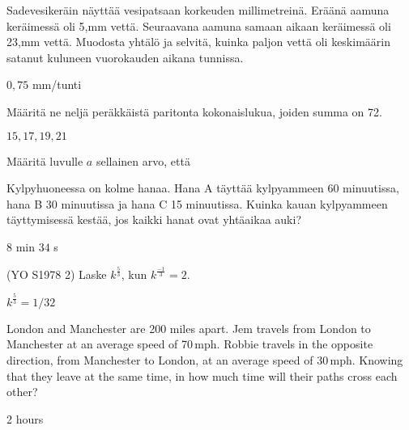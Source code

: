 \begin{tehtavasivu}
\begin{tehtava}
Sadevesikeräin näyttää vesipatsaan korkeuden millimetreinä. Eräänä aamuna
keräimessä oli 5,mm vettä. Seuraavana aamuna samaan aikaan keräimessä oli 23,mm vettä. Muodosta yhtälö ja selvitä, kuinka paljon vettä oli keskimäärin satanut kuluneen vuorokauden aikana tunnissa.
	\begin{vastaus}
	$0,75$ mm/tunti
	\end{vastaus}
\end{tehtava}

\begin{tehtava}
Määritä ne neljä peräkkäistä paritonta kokonaislukua, joiden summa on 72.
	\begin{vastaus}
	 $15, 17, 19, 21$
	\end{vastaus}
\end{tehtava}


\begin{tehtava}
Määritä luvulle $a$ sellainen arvo, että
  \begin{alakohdat}
  \end{alakohdat}
\begin{vastaus}
   \begin{alakohdat}
      \end{alakohdat}
\end{vastaus}
\end{tehtava}

\begin{tehtava}
Kylpyhuoneessa on kolme hanaa. Hana A täyttää kylpyammeen 60 minuutissa, hana B 30 minuutissa ja hana C 15 minuutissa. Kuinka kauan kylpyammeen täyttymisessä kestää, jos kaikki hanat ovat yhtäaikaa auki?
\begin{vastaus}
$8$ min $34$ s
\end{vastaus}
\end{tehtava}

\begin{tehtava}
\star (YO S1978 2) Laske $k^\frac{5}{3}$, kun $k^\frac{-1}{3}=2$. \\
	\begin{vastaus}
		$k^\frac{5}{3}=1/32$
	\end{vastaus}
\end{tehtava}

\begin{tehtava}
London and Manchester are 200 miles apart. Jem travels from London to Manchester at an average speed of 70\,mph. Robbie travels in the opposite direction, from Manchester to London, at an average speed of 30\,mph. Knowing that they leave at the same time, in how much time will their paths cross each other?
	\begin{vastaus}
		2 hours
	\end{vastaus}
\end{tehtava}


\end{tehtavasivu}
